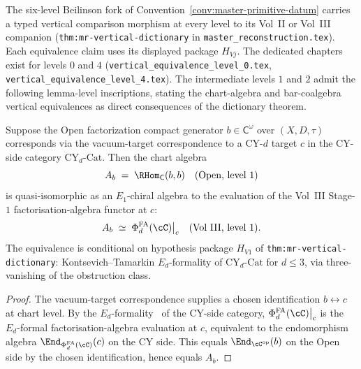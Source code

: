 The six-level Beilinson fork of
Convention~\ref{conv:master-primitive-datum} carries a typed vertical
comparison morphism at every level to its Vol~II or Vol~III companion
\textup{(}\texttt{thm:mr-vertical-dictionary} in
\texttt{master\_reconstruction.tex}\textup{).}  Each equivalence claim
uses its displayed package $H_{Vj}$.  The dedicated chapters
exist for levels $0$ and $4$
\textup{(}\texttt{vertical\_equivalence\_level\_0.tex},
\texttt{vertical\_equivalence\_level\_4.tex}\textup{).}  The
intermediate levels $1$ and $2$ admit the following lemma-level
inscriptions, stating the chart-algebra and bar-coalgebra vertical
equivalences as direct consequences of the dictionary theorem.

\begin{lemma}
\label{lem:master-vertical-level-1}
Suppose the Open factorization compact generator $b\in\mathsf C^\omega$
over $(X,D,\tau)$ corresponds via the vacuum-target
correspondence to a CY-$d$ target $c$ in the CY-side category
$\mathrm{CY}_d\text{-Cat}$. Then the chart algebra
\[
A_b \;=\; \RHom_{\mathsf C}(b,b)
\quad\text{(Open, level~$1$)}
\]
is quasi-isomorphic as an $E_1$-chiral algebra to the evaluation of
the Vol~III Stage-$1$ factorisation-algebra functor at $c$:
\[
A_b \;\simeq\; \Phi_d^{\mathrm{FA}}(\cC)\bigl|_c
\quad\text{(Vol~III, level~$1$).}
\]
The equivalence is conditional on hypothesis package $H_{V1}$ of
\texttt{thm:mr-vertical-dictionary}: Kontsevich--Tamarkin
$E_d$-formality of $\mathrm{CY}_d\text{-Cat}$ for $d \leq 3$, via
three-vanishing of the obstruction class.
\end{lemma}

\begin{proof}
The vacuum-target correspondence supplies a chosen identification
$b \leftrightarrow c$ at chart level. By the
$E_d$-formality~\cite{Kon99,CalaqueWillwacher21} of the CY-side
category, $\Phi_d^{\mathrm{FA}}(\cC)\bigl|_c$ is the $E_d$-formal
factorisation-algebra evaluation at $c$, equivalent to the
endomorphism algebra
$\End_{\Phi_d^{\mathrm{FA}}(\cC)}(c)$ on the CY side. This equals
$\End_{\cC^{\mathrm{op}}}(b)$ on the Open side by the chosen
identification, hence equals $A_b$.
\end{proof}

